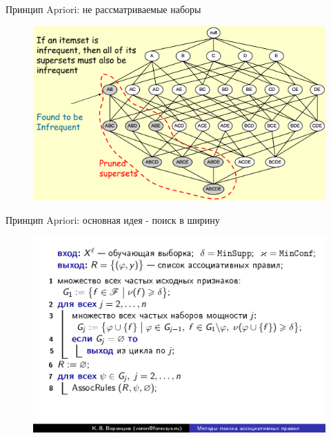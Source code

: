 \documentclass{beamer}
\begin{document}
\begin{frame}{Принцип Apriori: не рассматриваемые наборы}
\begin{figure}[h]
\centering
\includegraphics[scale=0.75]{images/lec08-pic11.png}
\end{figure}
\end{frame}

\begin{frame}{Принцип Apriori: основная идея - поиск в ширину}
\begin{figure}[h]
\centering
\includegraphics[scale=0.45]{images/lec08-pic12.png}
\end{figure}
\end{frame}
\end{document}
